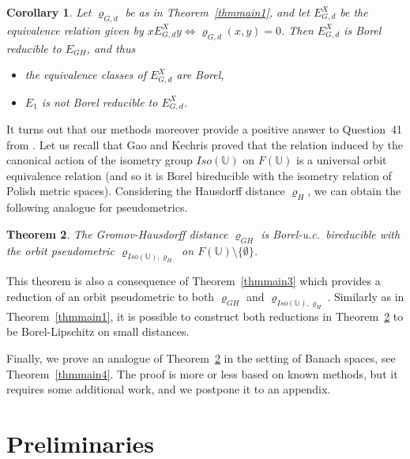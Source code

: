 \documentclass[a4paper]{amsart}
\theoremstyle{plain}
\newtheorem{theorem}{Theorem}[section]
\newtheorem{corollary}[theorem]{Corollary}
\theoremstyle{remark}
\begin{document}
\begin{corollary} \label{corzerodist}
Let $ \varrho_{G, d} $ be as in Theorem~\ref{thmmain1}, and let $ E^{X}_{G, d} $ be the equivalence relation given by $ x E^{X}_{G, d} y \Leftrightarrow \varrho_{G, d}(x, y) = 0 $. Then $ E^{X}_{G, d} $ is Borel reducible to $ E_{GH} $, and thus
\begin{itemize}
\item the equivalence classes of $ E^{X}_{G, d} $ are Borel,
\item $ E_{1} $ is not Borel reducible to $ E^{X}_{G, d} $.
\end{itemize}
\end{corollary}


It turns out that our methods moreover provide a positive answer to Question~41 from \cite{cdk1}. Let us recall that Gao and Kechris \cite{gaokech} proved that the relation induced by the canonical action of the isometry group $ Iso(\mathbb{U}) $ on $ F(\mathbb{U}) $ is a universal orbit equivalence relation (and so it is Borel bireducible with the isometry relation of Polish metric spaces). Considering the Hausdorff distance $ \varrho_{H} $, we can obtain the following analogue for pseudometrics.


\begin{theorem} \label{thmmain2}
The Gromov-Hausdorff distance $ \varrho_{GH} $ is Borel-u.c.~bireducible with the orbit pseudometric $ \varrho_{Iso(\mathbb{U}), \varrho_{H}} $ on $ F(\mathbb{U}) \setminus \{ \emptyset \} $.
\end{theorem}


This theorem is also a consequence of Theorem~\ref{thmmain3} which provides a reduction of an orbit pseudometric to both $ \varrho_{GH} $ and $ \varrho_{Iso(\mathbb{U}), \varrho_{H}} $. Similarly as in Theorem~\ref{thmmain1}, it is possible to construct both reductions in Theorem~\ref{thmmain2} to be Borel-Lipschitz on small distances.

Finally, we prove an analogue of Theorem~\ref{thmmain2} in the setting of Banach spaces, see Theorem~\ref{thmmain4}. The proof is more or less based on known methods, but it requires some additional work, and we postpone it to an appendix.




\section{Preliminaries} \label{section:prelim}
\end{document}
